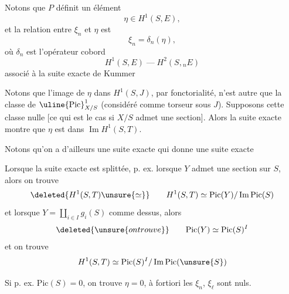 Notons que $P$ définit un élément
\[
\boxed{\eta\in H^1(S,E)},
\]
et la relation entre $\xi_n$ et $\eta$ est
\[
\boxed{\xi_n=\delta_n(\eta)},
\]
où $\delta_n$ est l'opérateur cobord
\[
H^1(S,E)\mathbin{\text{---}}H^2(S,{}_n E)
\]
associé à la suite exacte de Kummer

Notons que l'image de $\eta$ dans $H^1(S,J)$, par fonctorialité, n'est autre que la classe de $\uline{\mathrm{Pic}}^1_{X/S}$ (considéré comme torseur sous $J$). Supposons cette classe nulle [ce qui est le cas si $X/S$ admet une section].  Alors la suite exacte
montre que \deleted{$\unsure{\eta}$} $\eta$ est dans $\operatorname{Im}H^1(S,T)$.

Notons qu'on a d'ailleurs une suite exacte 
qui donne une suite exacte 

Lorsque la suite exacte est splittée, p. ex. lorsque $Y$ admet une section sur $S$, alors on trouve
\[
\deleted{H^1(S,T)\unsure{\simeq}}\qquad H^1(S,T)\simeq\mathrm{Pic}(Y)/\operatorname{Im}\mathrm{Pic}(S)
\]
et lorsque $Y=\coprod_{i\in I}g_i(S)$ comme dessus, alors
\[
\deleted{\unsure{on trouve}}\qquad\mathrm{Pic}(Y)\simeq\mathrm{Pic}(S)^I
\]
et on trouve
\[
H^1(S,T)\simeq\mathrm{Pic}(S)^I/\operatorname{Im}\mathrm{Pic}(\unsure{S})
\]

Si p. ex. $\mathrm{Pic}(S)=0$, on trouve $\eta=0$, à fortiori les $\xi_n$, $\xi_\ell$ sont nuls.

